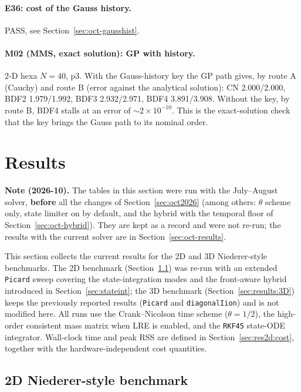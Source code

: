 \documentclass[11pt,a4paper]{article}
\newcommand{\code}[1]{\texttt{\small #1}}
\begin{document}
\paragraph{E36: cost of the Gauss history.} PASS, see
Section~\ref{sec:oct-gausshist}.

\paragraph{M02 (MMS, exact solution): GP with history.} 2-D hexa $N=40$, p3. With
the Gauss-history key the GP path gives, by route A (Cauchy) and route B (error
against the analytical solution): CN 2.000/2.000, BDF2 1.979/1.992, BDF3
2.932/2.971, BDF4 3.891/3.908. Without the key, by route B, BDF4 stalls at an error
of $\sim2\times10^{-10}$. This is the exact-solution check that the key brings the
Gauss path to its nominal order.

\section{Results}
\label{sec:results}

\textbf{Note (2026-10).} The tables in this section were run with the July--August
solver, \textbf{before} all the changes of Section~\ref{sec:oct2026} (among others:
$\theta$ scheme only, state limiter on by default, and the hybrid with the temporal
floor of Section~\ref{sec:oct-hybrid}). They are kept as a record and were not
re-run; the results with the current solver are in
Section~\ref{sec:oct-results}.

This section collects the current results for the 2D and 3D
Niederer-style benchmarks. The 2D benchmark (Section~\ref{sec:results:2D}) was re-run
with an extended \code{Picard} sweep covering the state-integration modes and
the front-aware hybrid introduced in
Section~\ref{sec:stateint}; the 3D benchmark (Section~\ref{sec:results:3D}) keeps
the previously reported results (\code{Picard} and \code{diagonalIion}) and is not
modified here. All runs use the Crank--Nicolson time scheme
($\theta = 1/2$), the high-order consistent mass matrix when LRE is
enabled, and the \code{RKF45} state-ODE integrator. Wall-clock time
and peak RSS are defined in Section~\ref{sec:res2d:cost}, together
with the hardware-independent cost quantities.

\subsection{2D Niederer-style benchmark}
\label{sec:results:2D}
\end{document}
